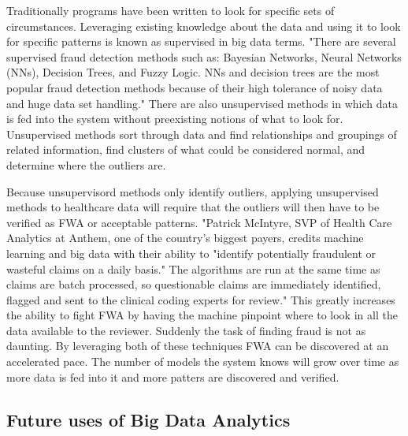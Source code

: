 \documentclass[sigconf]{acmart}
\begin{document}
Traditionally programs have been written to look for specific sets of circumstances.  
Leveraging existing knowledge about the data and using it to look for specific patterns 
is known as supervised in big data terms.  "There are several supervised fraud detection 
methods such as: Bayesian Networks, Neural Networks (NNs), Decision Trees, and Fuzzy 
Logic. NNs and decision trees are the most popular fraud detection methods because of 
their high tolerance of noisy data and huge data set handling."  There are also 
unsupervised methods in which data is fed into the system without preexisting notions 
of what to look for\cite{Ghuse}.  Unsupervised methods sort through data and find 
relationships and groupings of related information, find clusters of what could be 
considered normal, and determine where the outliers are.

Because unsupervisord methods only identify outliers, applying unsupervised methods to 
healthcare data will require that the outliers will then have to be verified as FWA or 
acceptable patterns.  "Patrick McIntyre, SVP of Health Care Analytics at Anthem, one 
of the country's biggest payers, credits machine learning and big data with their 
ability to "identify potentially fraudulent or wasteful claims on a daily basis." The 
algorithms are run at the same time as claims are batch processed, so questionable 
claims are immediately identified, flagged and sent to the clinical coding experts for 
review."\cite{Datameer}  This greatly increases the ability to fight FWA by having the 
machine pinpoint where to look in all the data available to the reviewer.  Suddenly the task 
of finding fraud is not as daunting.  By leveraging both of these techniques FWA can be 
discovered at an accelerated pace.  The number of models the system knows will grow over 
time as more data is fed into it and more patters are discovered and verified.


\subsection{Future uses of Big Data Analytics}
\end{document}
